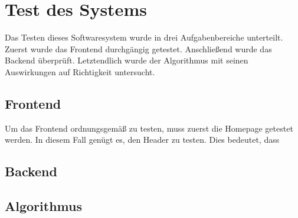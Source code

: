 \chapter{Test des Systems}
\label{chapter:testing}

	Das Testen dieses Softwaresystem wurde in drei Aufgabenbereiche unterteilt.
	Zuerst wurde das Frontend durchgängig getestet.
	Anschließend wurde das Backend überprüft.
	Letztendlich wurde der Algorithmus mit seinen Auswirkungen auf Richtigkeit untersucht.
	
	\section{Frontend}
		Um das Frontend ordnungsgemäß zu testen, muss zuerst die Homepage getestet werden.
		In diesem Fall genügt es, den Header zu testen.
		Dies bedeutet, dass
			
	\section{Backend}
	
	\section{Algorithmus}
	
